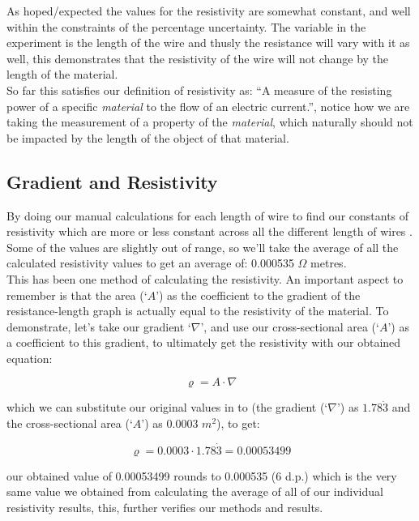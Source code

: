 \documentclass{article}
\begin{document}
As hoped/expected the values for the resistivity are somewhat constant, and well within the constraints of the percentage uncertainty. The variable in the experiment is the length of the wire and thusly the resistance will vary with it as well, this demonstrates that the resistivity of the wire will not change by the length of the material.\\

So far this satisfies our definition of resistivity as: ``A measure of the resisting power of a specific \emph{material} to the flow of an electric current.'', notice how we are taking the measurement of a property of the \emph{material}, which naturally should not be impacted by the length of the object of that material.

\subsection{Gradient and Resistivity}
By doing our manual calculations for each length of wire to find our constants of resistivity which are more or less constant across all the different length of wires .\\

Some of the values are slightly out of range, so we'll take the average of all the calculated resistivity values to get an average of: 0.000535 $\Omega$ metres.\\

This has been one method of calculating the resistivity. An important aspect to remember is that the area (`$A$') as the coefficient to the gradient of the resistance-length graph is actually equal to the resistivity of the material.
To demonstrate, let's take our gradient `$\nabla$', and use our cross-sectional area (`$A$') as a coefficient to this gradient, to ultimately get the resistivity with our obtained equation:

\[ \varrho = A \cdot \nabla \]

which we can substitute our original values in to (the gradient (`$\nabla$') as $1.78\dot{3}$ and the cross-sectional area (`$A$') as 0.0003 $m^2$), to get:

\[ \varrho = 0.0003 \cdot 1.78\dot{3} = 0.00053499 \]

our obtained value of 0.00053499 rounds to 0.000535 (6 d.p.) which is the very same value we obtained from calculating the average of all of our individual resistivity results, this, further verifies our methods and results.
\end{document}
